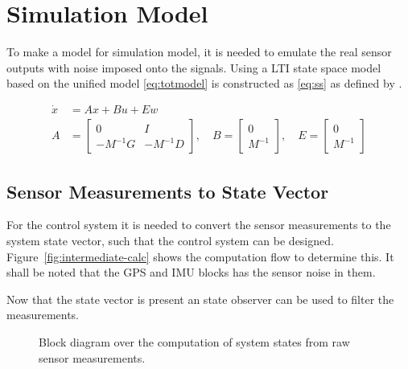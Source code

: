 \chapter{Simulation Model}

To make a model for simulation model, it is needed to emulate the
real sensor outputs with noise imposed onto the signals. Using a
\ac{LTI} state space model based on the unified model \vref{eq:totmodel}
is constructed as \vref{eq:ss} as defined by \citep[p. 175]{fossen}.

\begin{subequations}
\begin{align}
\dot x &=  A x + B u + E w \\
A &=
\begin{bmatrix}
0 & I\\
	-M^{-1}G & -M^{-1}D
\end{bmatrix}, \quad
B = 
\begin{bmatrix}
	0 \\
	M^{-1}
\end{bmatrix}, \quad
E =
\begin{bmatrix}
0 \\
M^{-1}
\end{bmatrix}
\end{align}
\label{eq:ss}
\end{subequations}


\section{Sensor Measurements to State Vector}
For the control system it is needed to convert the sensor measurements
to the system state vector, such that the control system can be
designed. Figure~\vref{fig:intermediate-calc} shows the computation
flow to determine this. It shall be noted that the \ac{GPS} and
\ac{IMU} blocks has the sensor noise in them.

Now that the state vector is present an state observer can be used to
filter the measurements.

\begin{figure}
	\centering
	
	\caption{Block diagram over the computation of system states from
	raw sensor measurements.}
	\label{fig:intermediate-calc}
\end{figure}
